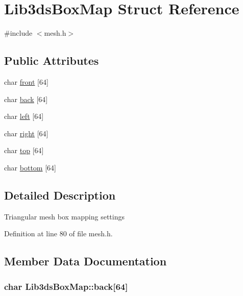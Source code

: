 \hypertarget{struct_lib3ds_box_map}{\section{Lib3ds\-Box\-Map Struct Reference}
\label{struct_lib3ds_box_map}
}


{\ttfamily \#include $<$mesh.\-h$>$}

\subsection*{Public Attributes}
\begin{DoxyCompactItemize}
\item 
char \hyperlink{struct_lib3ds_box_map_ac5fbb670246fe7b165d547cc46cdd694}{front} \mbox{[}64\mbox{]}
\item 
char \hyperlink{struct_lib3ds_box_map_a06985c8cd99d3f8b03dd03487e513a72}{back} \mbox{[}64\mbox{]}
\item 
char \hyperlink{struct_lib3ds_box_map_ae7f9dc3174d3c925226923199f6e2cd4}{left} \mbox{[}64\mbox{]}
\item 
char \hyperlink{struct_lib3ds_box_map_a7cbb30ddf56d87c28185c3bed3245552}{right} \mbox{[}64\mbox{]}
\item 
char \hyperlink{struct_lib3ds_box_map_a0f0280626fcd5c4f76260b84dea7ec6c}{top} \mbox{[}64\mbox{]}
\item 
char \hyperlink{struct_lib3ds_box_map_a986713bc450255c6fbbf55865284530d}{bottom} \mbox{[}64\mbox{]}
\end{DoxyCompactItemize}


\subsection{Detailed Description}
Triangular mesh box mapping settings 

Definition at line 80 of file mesh.\-h.



\subsection{Member Data Documentation}
\hypertarget{struct_lib3ds_box_map_a06985c8cd99d3f8b03dd03487e513a72}{
\subsubsection[{back}]{\setlength{\rightskip}{0pt plus 5cm}char Lib3ds\-Box\-Map\-::back\mbox{[}64\mbox{]}}}\label{struct_lib3ds_box_map_a06985c8cd99d3f8b03dd03487e513a72}


